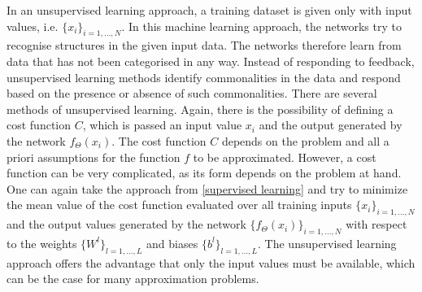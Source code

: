 In an unsupervised learning approach, a training dataset is given only with input values, i.e. $\{ x_i \}_{i = 1, \ldots, N}$. In this machine learning approach, the networks try to recognise structures in the given input data. The networks therefore learn from data that has not been categorised in any way. Instead of responding to feedback, unsupervised learning methods identify commonalities in the data and respond based on the presence or absence of such commonalities. There are several methods of unsupervised learning. Again, there is the possibility of defining a cost function $C$, which is passed an input value $x_i$ and the output generated by the network $f_{\Theta}(x_i)$. The cost function $C$ depends on the problem and all a priori assumptions for the function $f$ to be approximated. However, a cost function can be very complicated, as its form depends on the problem at hand. One can again take the approach from \cref{supervised learning} and try to minimize the mean value of the cost function evaluated over all training inputs $\{ x_i \}_{i = 1, \ldots, N}$ and the output values generated by the network $\{ f_{\Theta}(x_i) \}_{i = 1, \ldots, N}$ with respect to the weights $\{ W^l \}_{l = 1, \ldots, L}$ and biases $\{ b^l \}_{l = 1, \ldots, L}$. The unsupervised learning approach offers the advantage that only the input values must be available, which can be the case for many approximation problems. \\

